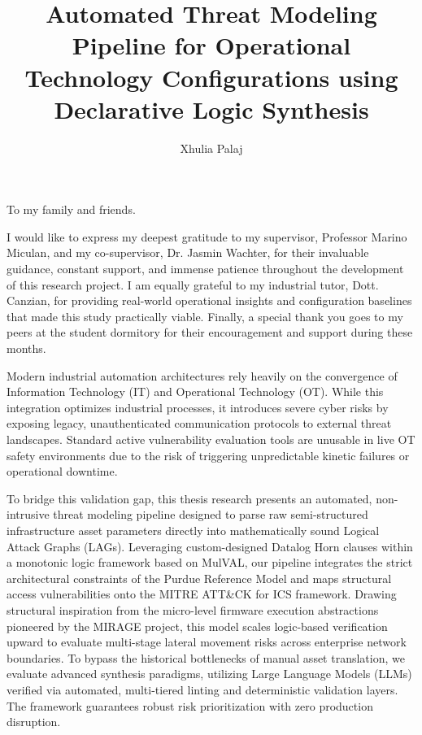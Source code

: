 \documentclass[target=mst,aauheader=aics,style=]{thud}
\title{Automated Threat Modeling Pipeline for Operational Technology Configurations using Declarative Logic Synthesis}
\author{Xhulia Palaj}
\begin{document}
\maketitle

\begin{dedication}
    To my family and friends.
\end{dedication}

\acknowledgements
I would like to express my deepest gratitude to my supervisor, Professor Marino Miculan, and my co-supervisor, Dr. Jasmin Wachter, for their invaluable guidance, constant support, and immense patience throughout the development of this research project. I am equally grateful to my industrial tutor, Dott. Canzian, for providing real-world operational insights and configuration baselines that made this study practically viable. Finally, a special thank you goes to my peers at the student dormitory for their encouragement and support during these months.

\abstract
Modern industrial automation architectures rely heavily on the convergence of Information Technology (IT) and Operational Technology (OT). While this integration optimizes industrial processes, it introduces severe cyber risks by exposing legacy, unauthenticated communication protocols to external threat landscapes. Standard active vulnerability evaluation tools are unusable in live OT safety environments due to the risk of triggering unpredictable kinetic failures or operational downtime. 

To bridge this validation gap, this thesis research presents an automated, non-intrusive threat modeling pipeline designed to parse raw semi-structured infrastructure asset parameters directly into mathematically sound Logical Attack Graphs (LAGs). Leveraging custom-designed Datalog Horn clauses within a monotonic logic framework based on MulVAL, our pipeline integrates the strict architectural constraints of the Purdue Reference Model and maps structural access vulnerabilities onto the MITRE ATT&CK for ICS framework. Drawing structural inspiration from the micro-level firmware execution abstractions pioneered by the MIRAGE project, this model scales logic-based verification upward to evaluate multi-stage lateral movement risks across enterprise network boundaries. To bypass the historical bottlenecks of manual asset translation, we evaluate advanced synthesis paradigms, utilizing Large Language Models (LLMs) verified via automated, multi-tiered linting and deterministic validation layers. The framework guarantees robust risk prioritization with zero production disruption.
\end{document}

